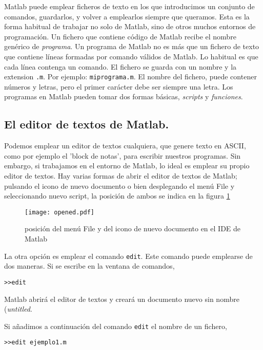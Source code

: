 Matlab puede emplear ficheros de texto en los que introducimos un conjunto de comandos, guardarlos, y volver a emplearlos siempre que queramos. Esta es la forma habitual de trabajar no solo de Matlab, sino de otros muchos entornos de programación. Un fichero que contiene código de Matlab recibe el nombre genérico de \emph{programa}. Un programa de Matlab no es más que un fichero de texto que contiene líneas formadas por comando válidos de Matlab. Lo habitual es que cada línea contenga un comando. El fichero se guarda con un nombre y la extension \texttt{.m}. Por ejemplo: \texttt{miprograma.m}. El nombre del fichero, puede contener números y letras, pero el primer carácter debe ser siempre una letra. Los programas en Matlab pueden tomar dos formas básicas, \emph{scripts} y \emph{funciones}.

\subsection{El editor de textos de Matlab.} 
Podemos emplear un editor de textos cualquiera, que genere texto en ASCII, como por ejemplo el 'block de notas', para escribir nuestros programas. Sin embargo, si trabajamos en el entorno de Matlab, lo ideal es emplear su propio editor de textos. Hay varias formas de abrir el editor de textos de Matlab; pulsando el icono de nuevo documento o bien desplegando el menú File y seleccionando nuevo script, la posición de ambos se indica en la figura \ref{fig:opened} 
\begin{figure}[h]
\centering
\texttt{[image: opened.pdf]}
\caption{posición del menú File y del icono de nuevo documento en el IDE de Matlab}
\label{fig:opened}
\end{figure}

La otra opción es emplear el comando \texttt{edit}. Este comando puede emplearse de dos maneras. Si se escribe en la ventana de comandos,

\begin{verbatim}
>>edit
\end{verbatim}
Matlab abrirá el editor de textos y creará un documento nuevo sin nombre (\emph{untitled}.

Si añadimos a continuación del comando \texttt{edit} el nombre de un fichero,
\begin{verbatim}
>>edit ejemplo1.m
\end{verbatim}

